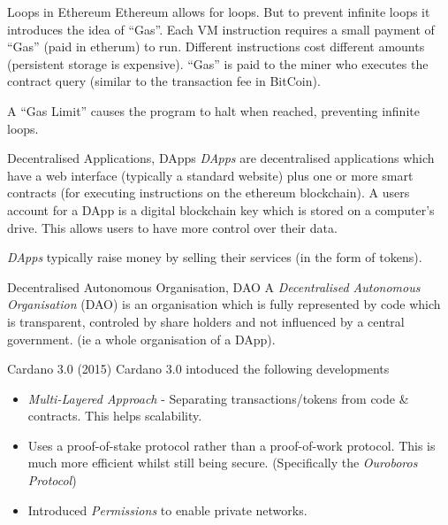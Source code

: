 \documentclass[11pt,a4paper]{article}
\begin{document}
  \begin{proposition}{Loops in Ethereum}
    Ethereum allows for loops. But to prevent infinite loops it introduces the idea of ``Gas''. Each VM instruction requires a small payment of ``Gas'' (paid in etherum) to run. Different instructions cost different amounts (persistent storage is expensive). ``Gas'' is paid to the miner who executes the contract query (similar to the transaction fee in BitCoin).
    \par A ``Gas Limit'' causes the program to halt when reached, preventing infinite loops.
  \end{proposition}

  \begin{proposition}{Decentralised Applications, DApps}
    \textit{DApps} are decentralised applications which have a web interface (typically a standard website) plus one or more smart contracts (for executing instructions on the ethereum blockchain). A users account for a DApp is a digital blockchain key which is stored on a computer's drive. This allows users to have more control over their data.
    \par \textit{DApps} typically raise money by selling their services (in the form of tokens).
  \end{proposition}

  \begin{proposition}{Decentralised Autonomous Organisation, DAO}
    A \textit{Decentralised Autonomous Organisation} (DAO) is an organisation which is fully represented by code which is transparent, controled by share holders and not influenced by a central government. (ie a whole organisation of a DApp).
  \end{proposition}

  \begin{proposition}{Cardano 3.0 (2015)}
    Cardano 3.0 intoduced the following developments
    \begin{itemize}
      \item \textit{Multi-Layered Approach} - Separating transactions/tokens from code \& contracts. This helps scalability.
      \item Uses a proof-of-stake protocol rather than a proof-of-work protocol. This is much more efficient whilst still being secure. (Specifically the \textit{Ouroboros Protocol})
      \item Introduced \textit{Permissions} to enable private networks.
    \end{itemize}
  \end{proposition}
\end{document}
